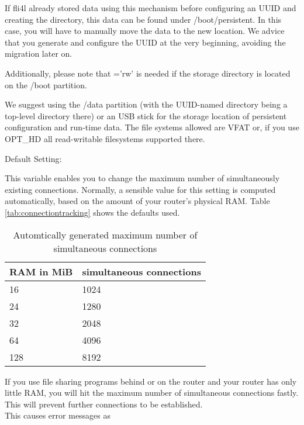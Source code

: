 \begin{description}
{    If fli4l already stored data using this mechanism before configuring an
    UUID and creating the directory, this data can be found under
    /boot/persistent. In this case, you will have to manually move the data to
    the new location. We advice that you generate and configure
    the UUID at the very beginning, avoiding the migration later on.

    Additionally, please note that ='rw' is needed
    if the storage directory is located on the /boot partition.

    We suggest using the /data partition (with the UUID-named directory being a
    top-level directory there) or an USB stick for the storage location of
    persistent configuration and run-time data. The file systems allowed are
    VFAT or, if you use OPT\_HD all read-writable filesystems supported there.}

  
  Default Setting: 

  This variable enables you to change the maximum number of simultaneously existing
  connections. Normally, a sensible value for this setting is computed
  automatically, based on the amount of your router's physical RAM. Table
  \ref{tab:connectiontracking} shows the defaults used.

    \begin{table}[ht!]
        \centering
        \caption{Automtically generated maximum number of simultaneous connections}
        \begin{tabular}{p{6cm}p{6cm}}
            RAM in MiB               &    simultaneous connections \\\hline
            16                       &    1024 \\
            24                       &    1280 \\
            32                       &    2048 \\
            64                       &    4096 \\
            128                      &    8192 \\
        \end{tabular}
    \end{table}

   If you use file sharing programs behind or on the router and your router
   has only little RAM, you will hit the maximum number of simultaneous
   connections fastly. This will prevent further connections to be
   established.\\
   This causes error messages as


\end{description}
